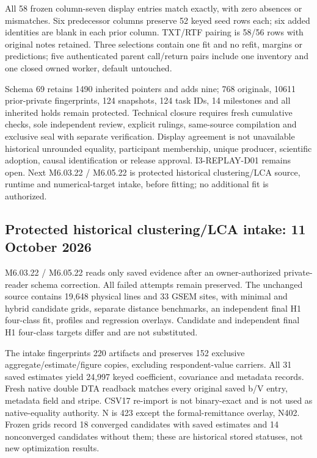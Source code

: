 \documentclass[11pt,a4paper]{article}
\begin{document}
All 58 frozen column-seven display entries match exactly, with zero absences or mismatches. Six predecessor columns preserve 52 keyed seed rows each; six added identities are blank in each prior column. TXT/RTF pairing is 58/56 rows with original notes retained. Three selections contain one fit and no refit, margins or predictions; five authenticated parent call/return pairs include one inventory and one closed owned worker, default untouched.

Schema 69 retains 1490 inherited pointers and adds nine; 768 originals, 10611 prior-private fingerprints, 124 snapshots, 124 task IDs, 14 milestones and all inherited holds remain protected. Technical closure requires fresh cumulative checks, sole independent review, explicit rulings, same-source compilation and exclusive seal with separate verification. Display agreement is not unavailable historical unrounded equality, participant membership, unique producer, scientific adoption, causal identification or release approval. I3-REPLAY-D01 remains open. Next M6.03.22 / M6.05.22 is protected historical clustering/LCA source, runtime and numerical-target intake, before fitting; no additional fit is authorized.
\subsection*{Protected historical clustering/LCA intake: 11 October 2026}
M6.03.22 / M6.05.22 reads only saved evidence after an owner-authorized private-reader schema correction. All failed attempts remain preserved. The unchanged source contains 19,648 physical lines and 33 GSEM sites, with minimal and hybrid candidate grids, separate distance benchmarks, an independent final H1 four-class fit, profiles and regression overlays. Candidate and independent final H1 four-class targets differ and are not substituted.

The intake fingerprints 220 artifacts and preserves 152 exclusive aggregate/estimate/figure copies, excluding respondent-value carriers. All 31 saved estimates yield 24,997 keyed coefficient, covariance and metadata records. Fresh native double DTA readback matches every original saved b/V entry, metadata field and stripe. CSV17 re-import is not binary-exact and is not used as native-equality authority. N is 423 except the formal-remittance overlay, N402. Frozen grids record 18 converged candidates with saved estimates and 14 nonconverged candidates without them; these are historical stored statuses, not new optimization results.
\end{document}
